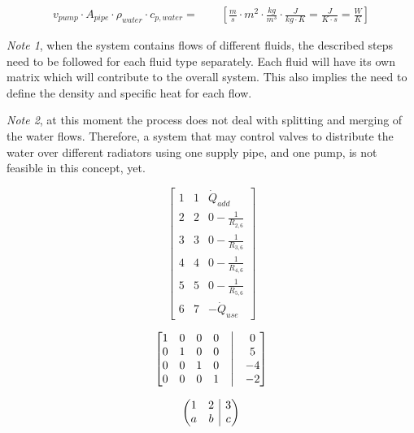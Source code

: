 \begin{equation}
	\begin{aligned}
		v_{pump} \cdot A_{pipe} \cdot \rho_{water} \cdot c_{p, water} =  \qquad \left[ \frac{m}{s} \cdot m^2 \cdot\frac{kg}{m^3} \cdot \frac{J}{kg \cdot K} = \frac{J}{K \cdot s} = \frac{W}{K}\right]
	\end{aligned}
\end{equation}

\emph{Note 1}, when the system contains flows of different fluids, the described steps need to be followed for each fluid type separately. Each fluid will have its own matrix which will contribute to the overall system. This also implies the need to define the density and specific heat for each flow.

\emph{Note 2}, at this moment the process does not deal with splitting and merging of the water flows. Therefore, a system that may control valves to distribute the water over different radiators using one supply pipe, and one pump, is not feasible in this concept, yet.   









\[
\begin{bmatrix}
	1 & 1 & \dot{Q}_{add}\\
	2 & 2 & 0 - \frac{1}{R_{2,6}}\\
	3 & 3 & 0 - \frac{1}{R_{3,6}}\\
	4 & 4 & 0 - \frac{1}{R_{4,6}}\\
	5 & 5 & 0 - \frac{1}{R_{5,6}}\\
	6 & 7 & -\dot{Q}_{use}
\end{bmatrix}
\]

$$
\begin{bmatrix}
	1 & 0 & 0 & 0 &\bigm| & 0 \\
	0 & 1 & 0 & 0 &\bigm| & 5 \\
	0 & 0 & 1 & 0 &\bigm| & -4 \\ 
	0 & 0 & 0 & 1 &\bigm| & -2
\end{bmatrix}
$$

\newenvironment{amatrix}[1]{%
	\left(\begin{array}{@{}*{#1}{c}|c@{}}
	}{%
	\end{array}\right)
}

\[
\begin{amatrix}{2}
	1 & 2 & 3 \\  a & b & c
\end{amatrix}
\]

